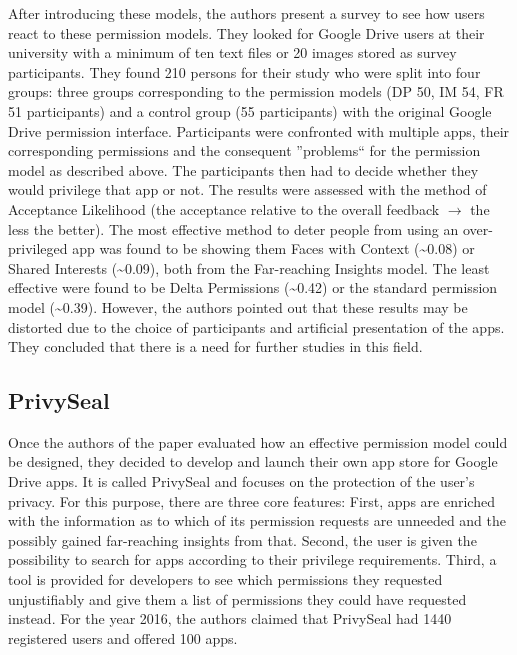 \documentclass[11pt,twocolumn,a4paper,DIV=calc]{scrartcl}
\begin{document}
After introducing these models, the authors present a survey to see how users react to these permission models. They looked for Google Drive users at their university with a minimum of ten text files or 20 images stored as survey participants. They found 210 persons for their study who were split into four groups: three groups corresponding to the permission models (DP 50, IM 54, FR 51 participants) and a control group (55 participants) with the original Google Drive permission interface. Participants were confronted with multiple apps, their corresponding permissions and the consequent ''problems`` for the permission model as described above. The participants then had to decide whether they would privilege that app or not. The results were assessed with the method of Acceptance Likelihood (the acceptance relative to the overall feedback $\rightarrow$ the less the better). The most effective method to deter people from using an over-privileged app was found to be showing them Faces with Context (\textasciitilde 0.08) or Shared Interests (\textasciitilde 0.09), both from the Far-reaching Insights model. The least effective were found to be Delta Permissions (\textasciitilde 0.42) or the standard permission model (\textasciitilde 0.39). However, the authors pointed out that these results may be distorted due to the choice of participants and artificial presentation of the apps. They concluded that there is a need for further studies in this field.
\subsection{PrivySeal} 
Once the authors of the paper evaluated how an effective permission model could be designed, they decided to develop and launch their own app store for Google Drive apps. It is called PrivySeal and focuses on the protection of the user's privacy. For this purpose, there are three core features: First, apps are enriched with the information as to which of its permission requests are unneeded and the possibly gained far-reaching insights from that. Second, the user is given the possibility to search for apps according to their privilege requirements. Third, a tool is provided for developers to see which permissions they requested unjustifiably and give them a list of permissions they could have requested instead. For the year 2016, the authors claimed that PrivySeal had 1440 registered users and offered 100 apps. 
\end{document}
